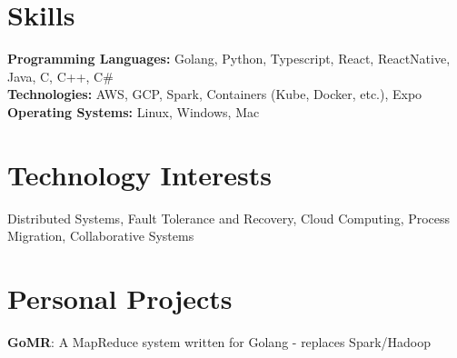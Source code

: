 \documentclass[10pt,margin,line]{resume}
\begin{document}
\begin{resume}
\begin{small}

\filbreak
\section{\mysidestyle Skills}
\textbf{Programming Languages:} Golang, Python, Typescript, React, ReactNative, Java, C, C++, C\#\\
\textbf{Technologies:}  AWS, GCP, Spark, Containers (Kube, Docker, etc.), Expo
\textbf{Operating Systems:} Linux, Windows, Mac

\section{\mysidestyle Technology Interests}
Distributed Systems, Fault Tolerance and Recovery, Cloud Computing, Process Migration, Collaborative Systems

\section{\mysidestyle Personal Projects}
\textbf{GoMR}: A MapReduce system written for Golang - replaces Spark/Hadoop\\




\end{small}
\end{resume}
\end{document}
